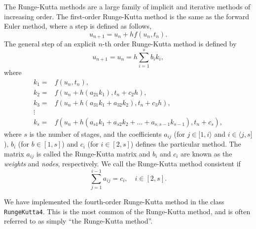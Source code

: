     The Runge-Kutta methods are a large family of implicit and iterative methods of 
    increasing order. The first-order Runge-Kutta method is the same as the forward 
    Euler method, where a step is defined as follows, 
    \begin{equation}
        u_{n+1} = u_n + h f(u_n, t_n).
    \end{equation}
    The general step of an explicit $n$-th order Runge-Kutta method is defined
    by
    \begin{equation}
        u_{n+1} = u_n = h \sum_{i=1}^s b_i k_i,
    \end{equation}
    where 
    \begin{equation}
        \begin{aligned}
            k_1 =& f(u_n, t_n), \\
            k_2 =& f(u_n + h(a_{21}k_1), t_n + c_2h), \\
            k_3 =& f(u_n + h(a_{31}k_1 + a_{32}k_2), t_n + c_3h), \\
                \vdots& \\
            k_s =& f(u_n + h(a_{s1}k_1 + a_{s2}k_2 + \dots + a_{s,s-1}k_{s-1}), t_n + c_s),
        \end{aligned}
    \end{equation}
    where $s$ is the number of stages, and the coefficients $a_{ij}$ 
    (for $j\in[1,i\rangle$ and $i\in\langle j, s]$), $b_i$ (for $b\in[1,s]$)
    and $c_i$ (for $i\in[2,s]$) defines the particular method. The matrix 
    $a_{ij}$ is called the Runge-Kutta matrix and $b_i$ and $c_i$ are known as the 
    \emph{weights} and \emph{nodes}, respectively. We call the Runge-Kutta method consistent 
    if
    \begin{equation*}
        \sum_{j=1}^{i-1} a_{ij} = c_i, \quad i \in[2,s].
    \end{equation*}

    We have implemented the fourth-order Runge-Kutta method in the class
    \lstinline{RungeKutta4}. This is the most common of the Runge-Kutta method, and is 
    often referred to as simply ``the Runge-Kutta method''. 

